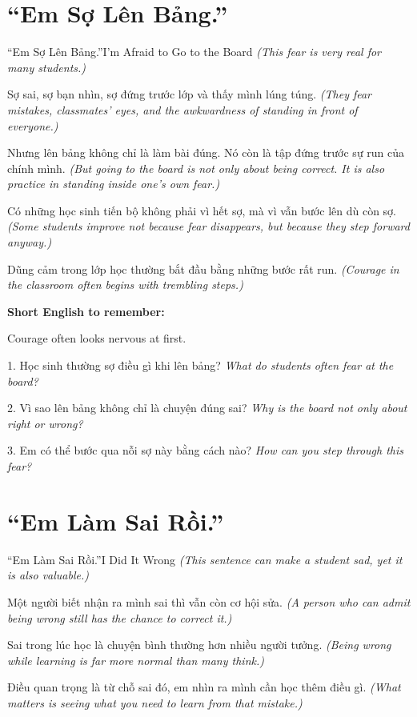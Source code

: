\section{``Em Sợ Lên Bảng.''}
\begin{truyen}{``Em Sợ Lên Bảng.''}{I'm Afraid to Go to the Board}
\textit{(This fear is very real for many students.)}

Sợ sai, sợ bạn nhìn, sợ đứng trước lớp và thấy mình lúng túng.
\textit{(They fear mistakes, classmates' eyes, and the awkwardness of standing in front of everyone.)}

Nhưng lên bảng không chỉ là làm bài đúng. Nó còn là tập đứng trước sự run của chính mình.
\textit{(But going to the board is not only about being correct. It is also practice in standing inside one's own fear.)}

Có những học sinh tiến bộ không phải vì hết sợ, mà vì vẫn bước lên dù còn sợ.
\textit{(Some students improve not because fear disappears, but because they step forward anyway.)}
\end{truyen}

\begin{baihoc}
Dũng cảm trong lớp học thường bắt đầu bằng những bước rất run.
\textit{(Courage in the classroom often begins with trembling steps.)}
\end{baihoc}

\begin{ghinhoanh}
\textbf{Short English to remember:}

Courage often looks nervous at first.

\end{ghinhoanh}

\begin{tuhocnhanh}
1. Học sinh thường sợ điều gì khi lên bảng? \textit{What do students often fear at the board?}

2. Vì sao lên bảng không chỉ là chuyện đúng sai? \textit{Why is the board not only about right or wrong?}

3. Em có thể bước qua nỗi sợ này bằng cách nào? \textit{How can you step through this fear?}
\end{tuhocnhanh}
\ngancach

\section{``Em Làm Sai Rồi.''}
\begin{truyen}{``Em Làm Sai Rồi.''}{I Did It Wrong}
\textit{(This sentence can make a student sad, yet it is also valuable.)}

Một người biết nhận ra mình sai thì vẫn còn cơ hội sửa.
\textit{(A person who can admit being wrong still has the chance to correct it.)}

Sai trong lúc học là chuyện bình thường hơn nhiều người tưởng.
\textit{(Being wrong while learning is far more normal than many think.)}

Điều quan trọng là từ chỗ sai đó, em nhìn ra mình cần học thêm điều gì.
\textit{(What matters is seeing what you need to learn from that mistake.)}
\end{truyen}

